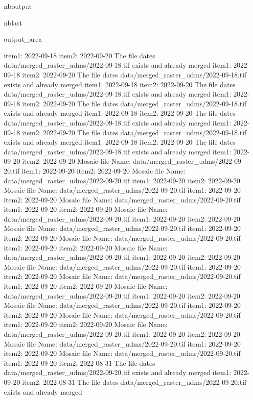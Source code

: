 \documentclass[letterpaper,10pt]{sphinxmanual}
\begin{document}
\begin{sphinxuseclass}{nboutput}
\begin{sphinxuseclass}{nblast}
{\begin{sphinxuseclass}{output_area}
\begin{sphinxuseclass}{}
\begin{sphinxVerbatim}[commandchars=\\\{\}]
item1:  2022-09-18
item2:  2022-09-20
The file dates data/merged\_raster\_udms/2022-09-18.tif exists and already merged
item1:  2022-09-18
item2:  2022-09-20
The file dates data/merged\_raster\_udms/2022-09-18.tif exists and already merged
item1:  2022-09-18
item2:  2022-09-20
The file dates data/merged\_raster\_udms/2022-09-18.tif exists and already merged
item1:  2022-09-18
item2:  2022-09-20
The file dates data/merged\_raster\_udms/2022-09-18.tif exists and already merged
item1:  2022-09-18
item2:  2022-09-20
The file dates data/merged\_raster\_udms/2022-09-18.tif exists and already merged
item1:  2022-09-18
item2:  2022-09-20
The file dates data/merged\_raster\_udms/2022-09-18.tif exists and already merged
item1:  2022-09-18
item2:  2022-09-20
The file dates data/merged\_raster\_udms/2022-09-18.tif exists and already merged
item1:  2022-09-20
item2:  2022-09-20
Mosaic file Name:  data/merged\_raster\_udms/2022-09-20.tif
item1:  2022-09-20
item2:  2022-09-20
Mosaic file Name:  data/merged\_raster\_udms/2022-09-20.tif
item1:  2022-09-20
item2:  2022-09-20
Mosaic file Name:  data/merged\_raster\_udms/2022-09-20.tif
item1:  2022-09-20
item2:  2022-09-20
Mosaic file Name:  data/merged\_raster\_udms/2022-09-20.tif
item1:  2022-09-20
item2:  2022-09-20
Mosaic file Name:  data/merged\_raster\_udms/2022-09-20.tif
item1:  2022-09-20
item2:  2022-09-20
Mosaic file Name:  data/merged\_raster\_udms/2022-09-20.tif
item1:  2022-09-20
item2:  2022-09-20
Mosaic file Name:  data/merged\_raster\_udms/2022-09-20.tif
item1:  2022-09-20
item2:  2022-09-20
Mosaic file Name:  data/merged\_raster\_udms/2022-09-20.tif
item1:  2022-09-20
item2:  2022-09-20
Mosaic file Name:  data/merged\_raster\_udms/2022-09-20.tif
item1:  2022-09-20
item2:  2022-09-20
Mosaic file Name:  data/merged\_raster\_udms/2022-09-20.tif
item1:  2022-09-20
item2:  2022-09-20
Mosaic file Name:  data/merged\_raster\_udms/2022-09-20.tif
item1:  2022-09-20
item2:  2022-09-20
Mosaic file Name:  data/merged\_raster\_udms/2022-09-20.tif
item1:  2022-09-20
item2:  2022-09-20
Mosaic file Name:  data/merged\_raster\_udms/2022-09-20.tif
item1:  2022-09-20
item2:  2022-09-20
Mosaic file Name:  data/merged\_raster\_udms/2022-09-20.tif
item1:  2022-09-20
item2:  2022-09-20
Mosaic file Name:  data/merged\_raster\_udms/2022-09-20.tif
item1:  2022-09-20
item2:  2022-09-20
Mosaic file Name:  data/merged\_raster\_udms/2022-09-20.tif
item1:  2022-09-20
item2:  2022-08-31
The file dates data/merged\_raster\_udms/2022-09-20.tif exists and already merged
item1:  2022-09-20
item2:  2022-08-31
The file dates data/merged\_raster\_udms/2022-09-20.tif exists and already merged

\end{sphinxVerbatim}
\end{sphinxuseclass}
\end{sphinxuseclass}}
\end{sphinxuseclass}
\end{sphinxuseclass}
\end{document}
